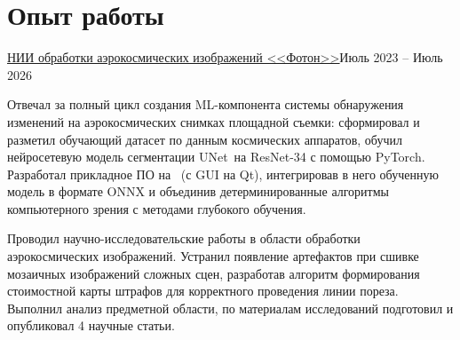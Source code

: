 \section{Опыт работы}
\resumeSubHeadingListStart
\resumeSubheadingCompany
{\href{https://rsreu.ru/vuz/structure/nii-foton}{\underline{НИИ обработки аэрокосмических изображений <<Фотон>>}}}{Июль 2023 -- Июль 2026}

\resumeSubrole{\currentRole}
\small{Отвечал за полный цикл создания ML-компонента системы обнаружения изменений на аэрокосмических снимках площадной съемки:
	сформировал и разметил обучающий датасет по данным космических аппаратов, обучил нейросетевую модель сегментации
	UNet\plusplus~на ResNet-34 с помощью PyTorch.
	Разработал прикладное ПО на \cpp~(с GUI на Qt), интегрировав в него обученную модель в формате ONNX и
	объединив детерминированные алгоритмы компьютерного зрения с методами глубокого обучения.}

\vspace{4pt}

\small{Проводил научно-исследовательские работы в области обработки аэрокосмических изображений.
	Устранил появление артефактов при сшивке мозаичных изображений сложных сцен,
	разработав алгоритм формирования стоимостной карты штрафов для корректного проведения линии пореза.
	Выполнил анализ предметной области, по материалам исследований подготовил и опубликовал 4 научные статьи.}
\resumeSubHeadingListEnd
